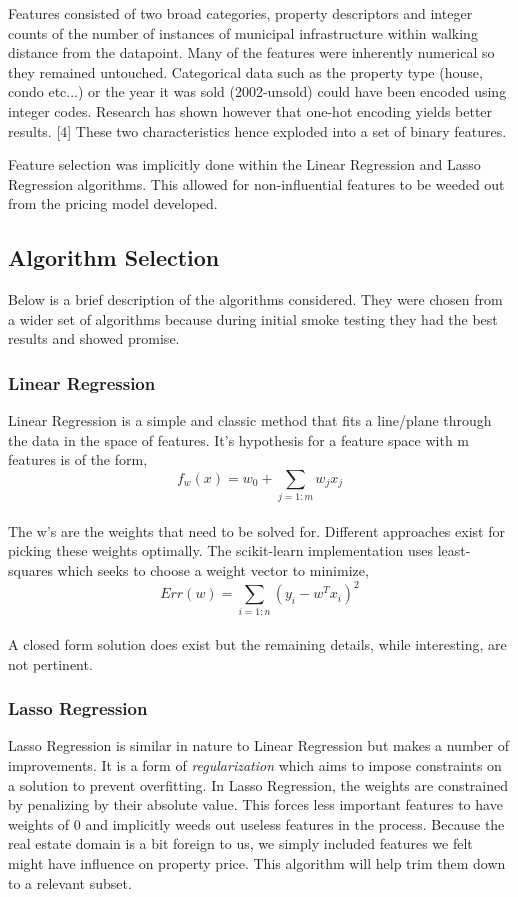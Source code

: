 \documentclass{acm_proc_article-sp}
\begin{document}
	Features consisted of two broad categories, property descriptors and integer counts of the number of instances of municipal infrastructure within walking distance from the datapoint. Many of the features were inherently numerical so they remained untouched. Categorical data such as the property type (house, condo etc...) or the year it was sold (2002-unsold) could have been encoded using integer codes. Research has shown however that one-hot encoding yields better results. [4] These two characteristics hence exploded into a set of binary features.
	
	Feature selection was implicitly done within the Linear Regression and Lasso Regression algorithms. This allowed for non-influential features to be weeded out from the pricing model developed.
	
\subsection{Algorithm Selection}
	Below is a brief description of the algorithms considered. They were chosen from a wider set of algorithms because during initial smoke testing they had the best results and showed promise.
	
\subsubsection{Linear Regression}
	Linear Regression is a simple and classic method that fits a line/plane through the data in the space of features. It's hypothesis for a feature space with m features is of the form, \\
	\[  f_{w}(x) = w_{0}  + \sum_{j=1:m}w_{j}x_{j} \] \\

	The w's are the weights that need to be solved for. Different approaches exist for picking these weights optimally. The scikit-learn implementation uses least-squares which seeks to choose a weight vector to minimize,
	\[ Err(w)  = \sum_{i=1:n}(y_{i} - w^{T}x_{i})^{2}\] \\
	
	A closed form solution does exist but the remaining details, while interesting, are not pertinent.
	
\subsubsection{Lasso Regression}
	Lasso Regression is similar in nature to Linear Regression but makes a number of improvements. It is a form of \emph{regularization} which aims to impose constraints on a solution to prevent overfitting. In Lasso Regression, the weights are constrained by penalizing by their absolute value. This forces less important features to have weights of 0 and implicitly weeds out useless features in the process. Because the real estate domain is a bit foreign to us, we simply included features we felt might have influence on property price. This algorithm will help trim them down to a relevant subset.
	
\end{document}
